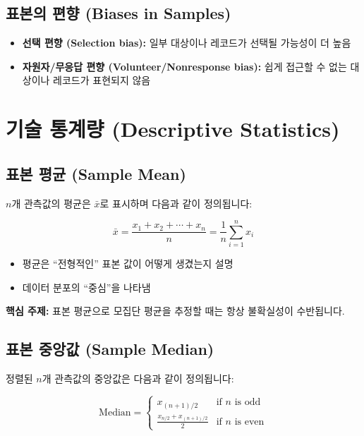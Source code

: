 \documentclass[12pt,a4paper]{article}
\begin{document}
\subsection{표본의 편향 (Biases in Samples)}

\begin{itemize}
    \item \textbf{선택 편향 (Selection bias):} 일부 대상이나 레코드가 선택될 가능성이 더 높음
    \item \textbf{자원자/무응답 편향 (Volunteer/Nonresponse bias):} 쉽게 접근할 수 없는 대상이나 레코드가 표현되지 않음
\end{itemize}

\section{기술 통계량 (Descriptive Statistics)}

\subsection{표본 평균 (Sample Mean)}

$n$개 관측값의 평균은 $\bar{x}$로 표시하며 다음과 같이 정의됩니다:

\begin{equation}
\bar{x} = \frac{x_1 + x_2 + \cdots + x_n}{n} = \frac{1}{n}\sum_{i=1}^{n}x_i
\end{equation}

\begin{itemize}
    \item 평균은 ``전형적인'' 표본 값이 어떻게 생겼는지 설명
    \item 데이터 분포의 ``중심''을 나타냄
\end{itemize}

\textbf{핵심 주제:} 표본 평균으로 모집단 평균을 추정할 때는 항상 불확실성이 수반됩니다.

\subsection{표본 중앙값 (Sample Median)}

정렬된 $n$개 관측값의 중앙값은 다음과 같이 정의됩니다:

\begin{equation}
\text{Median} = \begin{cases}
x_{(n+1)/2} & \text{if } n \text{ is odd} \\
\frac{x_{n/2} + x_{(n+1)/2}}{2} & \text{if } n \text{ is even}
\end{cases}
\end{equation}
\end{document}

